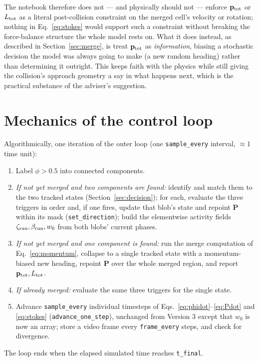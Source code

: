 \documentclass[11pt]{article}
\newcommand{\bP}{\mathbf{P}}
\newcommand{\bp}{\mathbf{p}}
\begin{document}
The notebook therefore does not — and physically should not — enforce
$\bp_{\rm tot}$ or $L_{\rm tot}$ as a literal post-collision
constraint on the merged cell's velocity or rotation; nothing in
Eq.~\eqref{eq:stokes} would support such a constraint without breaking
the force-balance structure the whole model rests on. What it does
instead, as described in Section~\ref{sec:merge}, is treat $\bp_{\rm
tot}$ as \emph{information}, biasing a stochastic decision the model
was always going to make (a new random heading) rather than
determining it outright. This keeps faith with the physics while
still giving the collision's approach geometry a say in what happens
next, which is the practical substance of the adviser's suggestion.

\section{Mechanics of the control loop}
\label{sec:mechanics}

Algorithmically, one iteration of the outer loop (one
\texttt{sample\_every} interval, $\approx1$ time unit):
\begin{enumerate}
\item Label $\phi>0.5$ into connected components.
\item \emph{If not yet merged and two components are found:} identify
and match them to the two tracked states (Section~\ref{sec:decision});
for each, evaluate the three triggers in order and, if one fires,
update that blob's state and repoint $\bP$ within its mask
(\texttt{set\_direction}); build the elementwise activity fields
$\zeta_{\rm run},\beta_{\rm run},w_0$ from both blobs' current phases.
\item \emph{If not yet merged and one component is found:} run the
merge computation of Eq.~\eqref{eq:momentum}, collapse to a single
tracked state with a momentum-biased new heading, repoint $\bP$ over
the whole merged region, and report $\bp_{\rm tot},L_{\rm tot}$.
\item \emph{If already merged:} evaluate the same three triggers for
the single state.
\item Advance \texttt{sample\_every} individual timesteps of
Eqs.~\eqref{eq:phidot}--\eqref{eq:Pdot} and \eqref{eq:stokes}
(\texttt{advance\_one\_step}), unchanged from Version 3 except that
$w_0$ is now an array; store a video frame every
\texttt{frame\_every} steps, and check for divergence.
\end{enumerate}
The loop ends when the elapsed simulated time reaches
\texttt{t\_final}.
\end{document}
